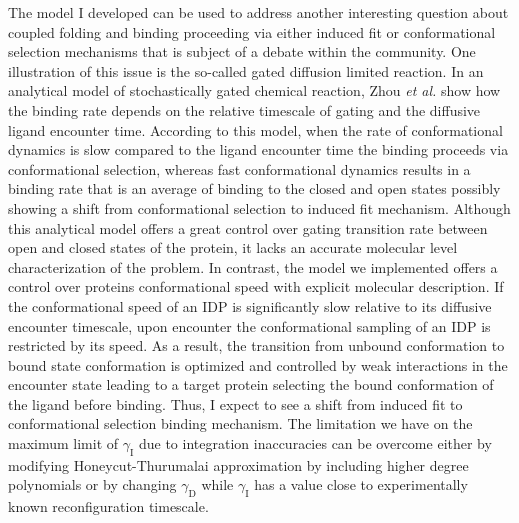 \documentclass[../talant.diss.submit.tex]{subfiles}
\begin{document}
The model I developed can be used to address another interesting question about
coupled folding and binding proceeding via either induced fit or conformational
selection mechanisms\cite{baker:14,espinoza-fonseca:09a,sugase:07} that is
subject of a debate within the community.  One illustration of this issue is the
so-called gated diffusion limited reaction.
In an analytical model of stochastically gated chemical reaction, Zhou
\textit{et al.} show how the binding rate depends on the relative timescale of
gating and the diffusive ligand encounter time.\cite{cai:11} According to this
model, when the rate of conformational dynamics is slow compared to the ligand
encounter time the binding proceeds via conformational selection, whereas fast
conformational dynamics results in a binding rate that is an average of binding
to the closed and open states possibly showing a shift from conformational
selection to induced fit mechanism. Although this analytical model offers a
great control over gating transition rate between open and closed states of the
protein, it lacks an accurate molecular level characterization of the problem.
In contrast, the model we implemented offers a control over proteins
conformational speed with explicit molecular description. If the conformational
speed of an IDP is significantly slow relative to its diffusive encounter
timescale, upon encounter the conformational sampling of an IDP is restricted by
its speed. As a result, the transition from unbound conformation to bound state
conformation is optimized and controlled by weak interactions in the encounter
state leading to a target protein selecting the bound conformation of the ligand
before binding. Thus, I expect to see a shift from induced fit to conformational
selection binding mechanism.  The limitation we have on the maximum limit of
$\gamma_{\mathrm{I}}$ due to integration inaccuracies can be overcome either by
modifying Honeycut-Thurumalai approximation by including higher degree
polynomials or by changing $\gamma_{\mathrm{D}}$ while $\gamma_{\mathrm{I}}$ has
a value close to experimentally known reconfiguration timescale.

\end{document}
